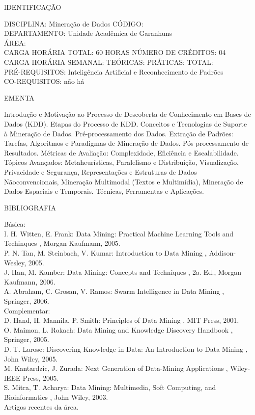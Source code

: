 \documentclass[
	12pt,				%
	openright,			%
  oneside,     %
	a4paper,			%
	english,			%
	french,				%
	spanish,			%
	brazil				%
	]{abntex2}
\begin{document}
\begin{apendicesenv}
\newpage IDENTIFICAÇÃO

DISCIPLINA: Mineração de Dados CÓDIGO:\\
DEPARTAMENTO: Unidade Acadêmica de Garanhuns\\
ÁREA:\\
CARGA HORÁRIA TOTAL: 60 HORAS NÚMERO DE CRÉDITOS: 04\\
CARGA HORÁRIA SEMANAL: TEÓRICAS: PRÁTICAS: TOTAL:\\
PRÉ-REQUISITOS: Inteligência Artificial e Reconhecimento de Padrões\\
CO-REQUISITOS: não há

EMENTA 

Introdução e Motivação ao Processo de Descoberta de Conhecimento em
Bases de Dados (KDD). Etapas do Processo de KDD. Conceitos e
Tecnologias de Suporte à Mineração de Dados. Pré-processamento dos
Dados. Extração de Padrões: Tarefas, Algoritmos e Paradigmas de
Mineração de Dados. Pós-processamento de Resultados. Métricas de
Avaliação: Complexidade, Eficiência e Escalabilidade. Tópicos
Avançados: Metaheurísticas, Paralelismo e Distribuição, Visualização,
Privacidade e Segurança, Representações e Estruturas de Dados
Nãoconvencionais, Mineração Multimodal (Textos e Multimídia), Mineração
de Dados Espaciais e Temporais. Técnicas, Ferramentas e Aplicações.

BIBLIOGRAFIA 

Básica:\\
I. H. Witten, E. Frank:  Data Mining: Practical
Machine Learning Tools and Techinques , Morgan
Kaufmann, 2005.\\
P. N. Tan, M. Steinbach, V. Kumar:  Introduction to
Data Mining , Addison-Wesley, 2005.\\
J. Han, M. Kamber:  Data Mining: Concepts and
Techniques , 2a. Ed., Morgan Kaufmann, 2006.\\
A. Abraham, C. Grosan, V. Ramos:  Swarm Intelligence
in Data Mining , Springer, 2006.\\
Complementar:\\
D. Hand, H. Mannila, P. Smith:  Principles of Data
Mining , MIT Press, 2001.\\
O. Maimon, L. Rokach:  Data Mining and Knowledge
Discovery Handbook , Springer, 2005.\\
D. T. Larose:  Discovering Knowledge in Data: An
Introduction to Data Mining , John Wiley, 2005.\\
M. Kantardzic, J. Zurada:  Next Generation of
Data-Mining Applications , Wiley-IEEE Press, 2005.\\
S. Mitra, T. Acharya:  Data Mining: Multimedia, Soft
Computing, and Bioinformatics , John Wiley, 2003.\\
Artigos recentes da área.


\end{apendicesenv}
\end{document}
